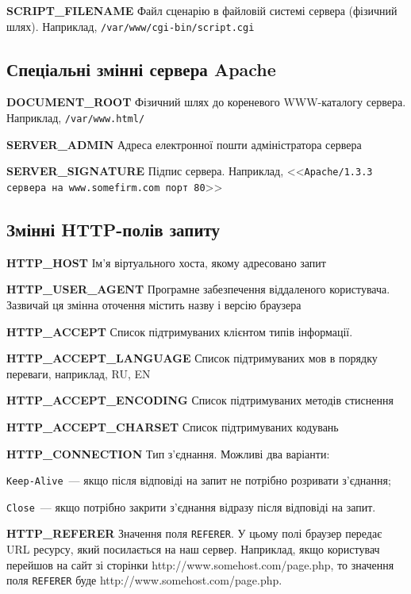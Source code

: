 \textbf{SCRIPT\_FILENAME} Файл сценарію в файловій системі сервера (фізичний шлях). Наприклад, \verb'/var/www/cgi-bin/script.cgi'


\subsection{Спеціальні змінні сервера Apache}

\textbf{DOCUMENT\_ROOT} Фізичний шлях до кореневого WWW-каталогу сервера. Наприклад, \verb'/var/www.html/'

\textbf{SERVER\_ADMIN} Адреса електронної пошти адміністратора сервера

\textbf{SERVER\_SIGNATURE} Підпис сервера. Наприклад, <<\verb'Apache/1.3.3 сервера на www.somefirm.com порт 80'>>


\subsection{Змінні HTTP-полів запиту}

\textbf{HTTP\_HOST} Ім'я віртуального хоста, якому адресовано запит

\textbf{HTTP\_USER\_AGENT} Програмне забезпечення віддаленого користувача. Зазвичай ця змінна оточення містить назву і версію браузера

\textbf{HTTP\_ACCEPT} Список підтримуваних клієнтом типів інформації. 

\textbf{HTTP\_ACCEPT\_LANGUAGE} Список підтримуваних мов в порядку переваги, наприклад, RU, EN

\textbf{HTTP\_ACCEPT\_ENCODING} Список підтримуваних методів стиснення

\textbf{HTTP\_ACCEPT\_CHARSET} Список підтримуваних кодувань

\textbf{HTTP\_CONNECTION} Тип з'єднання. Можливі два варіанти:
\begin{list}{•}{•}
\item \verb'Keep-Alive'~--- якщо після відповіді на запит не потрібно розривати з'єднання;
\item \verb'Close'~--- якщо потрібно закрити з'єднання відразу після відповіді на запит.
\end{list}

\textbf{HTTP\_REFERER} Значення поля \verb'REFERER'. У цьому полі браузер передає URL ресурсу, який посилається на наш сервер. Наприклад, якщо користувач перейшов на сайт зі сторінки http://www.somehost.com/page.php, то значення поля \verb'REFERER' буде http://www.somehost.com/page.php.

